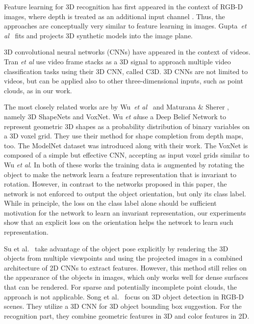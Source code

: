 \documentclass{bmvc2k}
\def\etal{\emph{et al}\bmvaOneDot}
\begin{document}
Feature learning for 3D recognition has first appeared in the context of RGB-D images, where depth is treated as an additional input channel \cite{farabet_learning_2013,couprie_indoor_2013,bo_unsupervised_2013}.
Thus, the approaches are conceptually very similar to feature learning in images.
Gupta~\etal~\cite{gupta_aligning_2015} fits and projects 3D synthetic models into the image plane.

3D convolutional neural networks (CNNs) have appeared in the context of videos. Tran \etal \cite{tran_c3d_2014} use video frame stacks as a 3D signal to approach multiple video classification tasks using their 3D CNN, called C3D. 3D CNNs are not limited to videos, but can be applied also to other three-dimensional inputs, such as point clouds, as in our work.

The most closely related works are by Wu~\etal~\cite{wu_3D_2015} and Maturana \& Sherer \cite{maturana_voxnet_2015}, namely 3D ShapeNets and VoxNet. Wu \etal use a Deep Belief Network to represent geometric 3D shapes as a probability distribution of binary variables on a 3D voxel grid. They use their method for shape completion from depth maps, too. The ModelNet dataset was introduced along with their work. The VoxNet \cite{maturana_voxnet_2015} is composed of a simple but effective CNN, accepting as input voxel grids similar to Wu \etal \cite{wu_3D_2015}. In both of these works the training data is augmented by rotating the object to make the network learn a feature representation that is invariant to rotation. However, in contrast to the networks proposed in this paper, the network is not enforced to output the object orientation, but only its class label. While in principle, the loss on the class label alone should be sufficient motivation for the network to learn an invariant representation, our experiments show that an explicit loss on the orientation helps the network to learn such representation.

Su et al.~\cite{su_multi-view_2015} take advantage of the object pose explicitly by rendering the 3D objects from multiple viewpoints and using the projected images in a combined architecture of 2D CNNs to extract features. However, this method still relies on the appearance of the objects in images, which only works well for dense surfaces that can be rendered. For sparse and potentially incomplete point clouds, the approach is not applicable. Song et al.~\cite{song_deep_2015} focus on 3D object detection in RGB-D scenes. They utilize a 3D CNN for 3D object bounding box suggestion. For the recognition part, they combine geometric features in 3D and color features in 2D.
\end{document}
